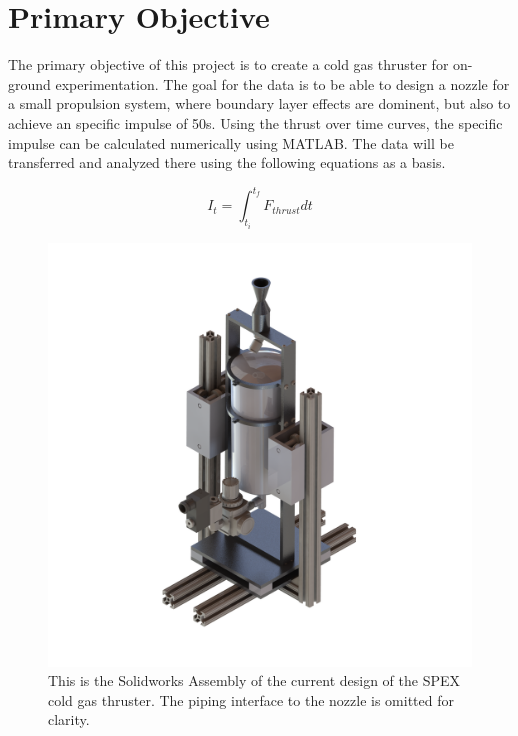 \documentclass[conference]{IEEEtran} %
\begin{document}
\section{Primary Objective}
\label{sec:primary-obj}
The primary objective of this project is to create a cold gas thruster for on-ground experimentation. The goal for the data is to be able to design a nozzle for a small propulsion system, where boundary
layer effects are dominent, but also to achieve an specific impulse of 50s. Using the thrust over time curves, the specific impulse can be
 calculated numerically using MATLAB\@. The data will be transferred and analyzed there using the following equations as a basis.


\begin{equation} \label{specific impulse}
  I_t    = \int_{t_i}^{t_f} F_{thrust} dt
\end{equation}

\begin{figure}[h]
  \includegraphics[width=\linewidth]{figs/cold-gas-thruster.png}
  \caption{This is the Solidworks Assembly of the current design of the SPEX cold gas thruster. The piping interface to the nozzle is omitted for clarity.}
\label{fig:lifecycle}
\end{figure}
\end{document}
